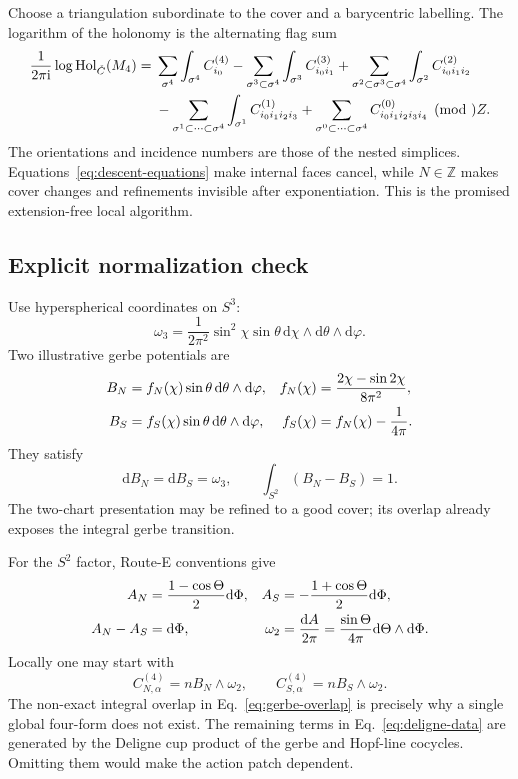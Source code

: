 \documentclass[11pt]{article}
\theoremstyle{definition}
\theoremstyle{remark}
\newcommand{\dd}{\mathrm d}
\newcommand{\ii}{\mathrm i}
\newcommand{\ZZ}{\mathbb Z}
\newcommand{\Hol}{\operatorname{Hol}}
\begin{document}
Choose a triangulation subordinate to the cover and a barycentric labelling.
The logarithm of the holonomy is the alternating flag sum
\begin{align}
 \frac{1}{2\pi\ii}\log\Hol_{\check C}(M_4)
 ={}&\sum_{\sigma^4}\int_{\sigma^4}C^{(4)}_{i_0}
 -\sum_{\sigma^3\subset\sigma^4}\int_{\sigma^3}C^{(3)}_{i_0i_1}
 +\sum_{\sigma^2\subset\sigma^3\subset\sigma^4}
   \int_{\sigma^2}C^{(2)}_{i_0i_1i_2}\notag\\
 &-\sum_{\sigma^1\subset\cdots\subset\sigma^4}
   \int_{\sigma^1}C^{(1)}_{i_0i_1i_2i_3}
 +\sum_{\sigma^0\subset\cdots\subset\sigma^4}
   C^{(0)}_{i_0i_1i_2i_3i_4}\pmod\ZZ.
 \label{eq:cech-holonomy}
\end{align}
The orientations and incidence numbers are those of the nested simplices.
Equations~\eqref{eq:descent-equations} make internal faces cancel, while
\(N\in\ZZ\) makes cover changes and refinements invisible after
exponentiation.  This is the promised extension-free local algorithm.

\subsection{Explicit normalization check}

Use hyperspherical coordinates on \(S^3\):
\begin{equation}
 \omega_3=\frac{1}{2\pi^2}\sin^2\chi\sin\theta\,
 \dd\chi\wedge\dd\theta\wedge\dd\varphi.
 \label{eq:s3-volume}
\end{equation}
Two illustrative gerbe potentials are
\begin{align}
 B_N&=f_N(\chi)\sin\theta\,\dd\theta\wedge\dd\varphi,
 &f_N(\chi)&=\frac{2\chi-\sin2\chi}{8\pi^2},\notag\\
 B_S&=f_S(\chi)\sin\theta\,\dd\theta\wedge\dd\varphi,
 &f_S(\chi)&=f_N(\chi)-\frac1{4\pi}.
 \label{eq:gerbe-potentials}
\end{align}
They satisfy
\begin{equation}
 \dd B_N=\dd B_S=\omega_3,
 \qquad
 \int_{S^2}(B_N-B_S)=1.
 \label{eq:gerbe-overlap}
\end{equation}
The two-chart presentation may be refined to a good cover; its overlap
already exposes the integral gerbe transition.

For the \(S^2\) factor, Route-E conventions give
\begin{align}
 A_N&=\frac{1-\cos\Theta}{2}\dd\Phi,&
 A_S&=-\frac{1+\cos\Theta}{2}\dd\Phi,\notag\\
 A_N-A_S&=\dd\Phi,&
 \omega_2&=\frac{\dd A}{2\pi}
 =\frac{\sin\Theta}{4\pi}\dd\Theta\wedge\dd\Phi.
 \label{eq:hopf-patches}
\end{align}
Locally one may start with
\begin{equation}
 C_{N,\alpha}^{(4)}=n B_N\wedge\omega_2,
 \qquad
 C_{S,\alpha}^{(4)}=n B_S\wedge\omega_2.
 \label{eq:local-four-potential}
\end{equation}
The non-exact integral overlap in Eq.~\eqref{eq:gerbe-overlap} is precisely
why a single global four-form does not exist.  The remaining terms in
Eq.~\eqref{eq:deligne-data} are generated by the Deligne cup product of the
gerbe and Hopf-line cocycles.  Omitting them would make the action patch
dependent.
\end{document}
